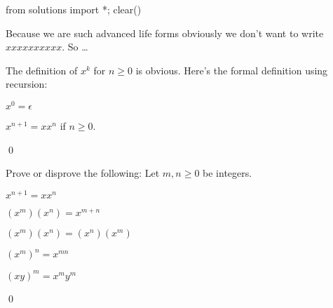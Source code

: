 \begin{python0}
from solutions import *; clear()
\end{python0}

 Because we are such advanced life forms obviously we don't want
 to write $xxxxxxxxxx$. So \ldots

 \begin{defn}  
 The definition of $x^k$ for $n \geq 0$ is obvious.
 Here's the formal definition using recursion:
 \begin{tightlist}
  \item $x^0 = \epsilon$
  \item $x^{n+1} = x x^n$ if $n \geq 0$.
 \end{tightlist}
 \qed
\end{defn}

 \newpage
 \begin{ex}
   Prove or disprove the following:
   Let $m,n \geq 0$ be integers.
   \begin{tightlist}
   \item $x^{n + 1} = x x^n$
   \item $(x^m)(x^n) = x^{m+n}$
   \item $(x^m)(x^n) = (x^n)(x^m)$
   \item $(x^m)^n = x^{mn}$
   \item $(xy)^m = x^m y^m$
   \end{tightlist}
   \qed
 \end{ex}
 

